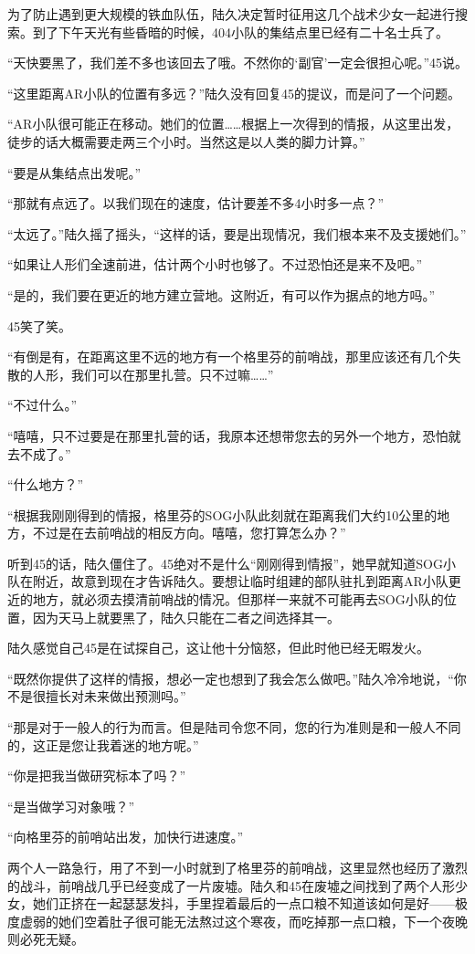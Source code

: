 为了防止遇到更大规模的铁血队伍，陆久决定暂时征用这几个战术少女一起进行搜索。到了下午天光有些昏暗的时候，404小队的集结点里已经有二十名士兵了。

“天快要黑了，我们差不多也该回去了哦。不然你的‘副官’一定会很担心呢。”45说。

“这里距离AR小队的位置有多远？”陆久没有回复45的提议，而是问了一个问题。

“AR小队很可能正在移动。她们的位置……根据上一次得到的情报，从这里出发，徒步的话大概需要走两三个小时。当然这是以人类的脚力计算。”

“要是从集结点出发呢。”

“那就有点远了。以我们现在的速度，估计要差不多4小时多一点？”

“太远了。”陆久摇了摇头，“这样的话，要是出现情况，我们根本来不及支援她们。”

“如果让人形们全速前进，估计两个小时也够了。不过恐怕还是来不及吧。”

“是的，我们要在更近的地方建立营地。这附近，有可以作为据点的地方吗。”

45笑了笑。

“有倒是有，在距离这里不远的地方有一个格里芬的前哨战，那里应该还有几个失散的人形，我们可以在那里扎营。只不过嘛……”

“不过什么。”

“嘻嘻，只不过要是在那里扎营的话，我原本还想带您去的另外一个地方，恐怕就去不成了。”

“什么地方？”

“根据我刚刚得到的情报，格里芬的SOG小队此刻就在距离我们大约10公里的地方，不过是在去前哨战的相反方向。嘻嘻，您打算怎么办？”

听到45的话，陆久僵住了。45绝对不是什么“刚刚得到情报”，她早就知道SOG小队在附近，故意到现在才告诉陆久。要想让临时组建的部队驻扎到距离AR小队更近的地方，就必须去摸清前哨战的情况。但那样一来就不可能再去SOG小队的位置，因为天马上就要黑了，陆久只能在二者之间选择其一。

陆久感觉自己45是在试探自己，这让他十分恼怒，但此时他已经无暇发火。

“既然你提供了这样的情报，想必一定也想到了我会怎么做吧。”陆久冷冷地说，“你不是很擅长对未来做出预测吗。”

“那是对于一般人的行为而言。但是陆司令您不同，您的行为准则是和一般人不同的，这正是您让我着迷的地方呢。”

“你是把我当做研究标本了吗？”

“是当做学习对象哦？”

“向格里芬的前哨站出发，加快行进速度。”

两个人一路急行，用了不到一小时就到了格里芬的前哨战，这里显然也经历了激烈的战斗，前哨战几乎已经变成了一片废墟。陆久和45在废墟之间找到了两个人形少女，她们正挤在一起瑟瑟发抖，手里捏着最后的一点口粮不知道该如何是好——极度虚弱的她们空着肚子很可能无法熬过这个寒夜，而吃掉那一点口粮，下一个夜晚则必死无疑。

